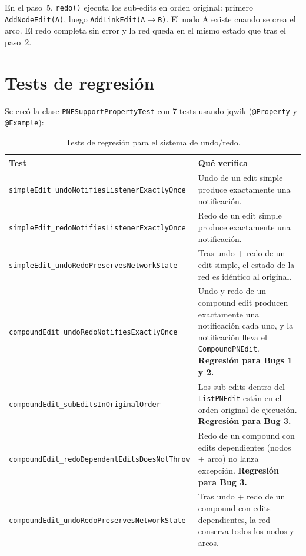 \documentclass[12pt,a4paper]{article}
\newcommand{\code}[1]{\texttt{#1}}
\newcommand{\clase}[1]{\texttt{#1}}
\newcommand{\metodo}[1]{\texttt{#1}}
\begin{document}
En el paso~5, \metodo{redo()} ejecuta los sub-edits en orden original:
primero \code{AddNodeEdit(A)}, luego \code{AddLinkEdit(A$\to$B)}. El nodo A
existe cuando se crea el arco. El redo completa sin error y la red queda en
el mismo estado que tras el paso~2.


\section{Tests de regresión}
\label{sec:tests}

Se creó la clase \code{PNESupportPropertyTest} con 7 tests usando jqwik
(\code{@Property} y \code{@Example}):

\begin{table}[H]
\centering
\caption{Tests de regresión para el sistema de undo/redo.}
\label{tab:tests}
\small
\begin{tabularx}{\textwidth}{lX}
\toprule
\textbf{Test} & \textbf{Qué verifica} \\
\midrule
\code{simpleEdit\_undoNotifies\-ListenerExactlyOnce} &
  Undo de un edit simple produce exactamente una notificación. \\
\addlinespace
\code{simpleEdit\_redoNotifies\-ListenerExactlyOnce} &
  Redo de un edit simple produce exactamente una notificación. \\
\addlinespace
\code{simpleEdit\_undoRedo\-PreservesNetworkState} &
  Tras undo + redo de un edit simple, el estado de la red es idéntico
  al original. \\
\addlinespace
\code{compoundEdit\_undoRedo\-NotifiesExactlyOnce} &
  Undo y redo de un compound edit producen exactamente una notificación cada
  uno, y la notificación lleva el \clase{CompoundPNEdit}. \textbf{Regresión
  para Bugs 1 y 2.} \\
\addlinespace
\code{compoundEdit\_subEdits\-InOriginalOrder} &
  Los sub-edits dentro del \clase{ListPNEdit} están en el orden original
  de ejecución. \textbf{Regresión para Bug 3.} \\
\addlinespace
\code{compoundEdit\_redo\-DependentEditsDoesNotThrow} &
  Redo de un compound con edits dependientes (nodos + arco) no lanza
  excepción. \textbf{Regresión para Bug 3.} \\
\addlinespace
\code{compoundEdit\_undoRedo\-PreservesNetworkState} &
  Tras undo + redo de un compound con edits dependientes, la red conserva
  todos los nodos y arcos. \\
\bottomrule
\end{tabularx}
\end{table}
\end{document}
